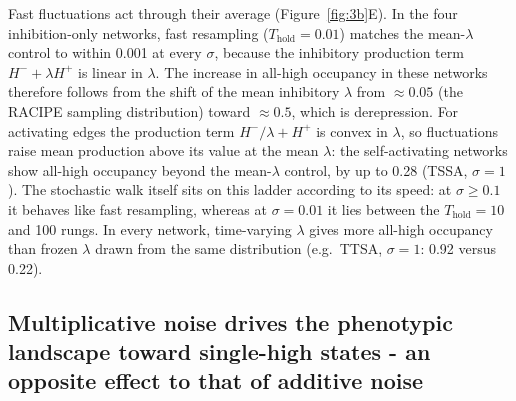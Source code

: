 \documentclass[11pt]{article}
\providecommand{\DIFaddtex}[1]{{\protect\color{red}#1}} %
\providecommand{\DIFdeltex}[1]{} %
\providecommand{\DIFaddbegin}{} %
\providecommand{\DIFaddend}{} %
\providecommand{\DIFdelbegin}{} %
\providecommand{\DIFdelend}{} %
\providecommand{\DIFadd}[1]{\texorpdfstring{\DIFaddtex{#1}}{#1}} %
\providecommand{\DIFdel}[1]{\texorpdfstring{\DIFdeltex{#1}}{}} %
\providecommand{\DIFaddincludegraphics}[2][]{\DIFOincludegraphics[#1]{#2}} %
\providecommand{\DIFdelincludegraphics}[2][]{}
\DeclareRobustCommand{\DIFaddbegin}{\DIFOaddbegin \let\includegraphics\DIFaddincludegraphics} %
\DeclareRobustCommand{\DIFaddend}{\DIFOaddend \let\includegraphics\DIFOincludegraphics} %
\DeclareRobustCommand{\DIFdelbegin}{\DIFOdelbegin \let\includegraphics\DIFdelincludegraphics} %
\DeclareRobustCommand{\DIFdelend}{\DIFOaddend \let\includegraphics\DIFOincludegraphics} %
\begin{document}
\DIFadd{Fast fluctuations act through their average (Figure~\ref{fig:3b}E). In the four inhibition-only networks, fast resampling ($T_\text{hold} = 0.01$) matches the mean-$\lambda$ control to within 0.001 at every $\sigma$, because the inhibitory production term $H^- + \lambda H^+$ is linear in $\lambda$. The increase in }\DIFaddend all-high \DIFdelbegin \DIFdel{state in the stationary distribution of the stochastic process. Even at lower values of $\sigma$, this asymmetry holds true by making the de-repressed state more easily accessible to the nodes of the network than the repressed states. Therefore, we conclude that the drift in the phenotypic landscape caused towards the }\DIFdelend \DIFaddbegin \DIFadd{occupancy in these networks therefore follows from the shift of the mean inhibitory $\lambda$ from $\approx 0.05$ (the RACIPE sampling distribution) toward $\approx 0.5$, which is derepression. For activating edges the production term $H^-/\lambda + H^+$ is convex in $\lambda$, so fluctuations raise mean production above its value at the mean $\lambda$: the self-activating networks show }\DIFaddend all-high \DIFdelbegin \DIFdel{state caused by additive noise is a combined outcome of the shift in the parameter space and the asymmetry exploited by stochastic simulations. }\DIFdelend \DIFaddbegin \DIFadd{occupancy beyond the mean-$\lambda$ control, by up to 0.28 (TSSA, $\sigma = 1$). The stochastic walk itself sits on this ladder according to its speed: at $\sigma \geq 0.1$ it behaves like fast resampling, whereas at $\sigma = 0.01$ it lies between the $T_\text{hold} = 10$ and 100 rungs. In every network, time-varying $\lambda$ gives more all-high occupancy than frozen $\lambda$ drawn from the same distribution (e.g.\ TTSA, $\sigma = 1$: 0.92 versus 0.22).
}\DIFaddend 

\subsection{Multiplicative noise drives the phenotypic landscape toward single-high states - an opposite effect \DIFdelbegin \DIFdel{as }\DIFdelend \DIFaddbegin \DIFadd{to }\DIFaddend that of additive noise}
\end{document}
